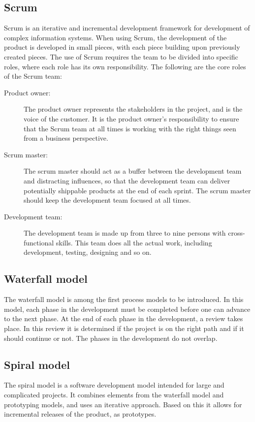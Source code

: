 \subsection{Scrum}
Scrum is an iterative and incremental development framework for development of complex information systems. When using Scrum, the development of the product is developed in small pieces, with each piece building upon previously created pieces. The use of Scrum requires the team to be divided into specific roles, where each role has its own responsibility. The following are the core roles of the Scrum team\cite{scrum}\cite{sommerville}:
\begin{description}
	\item[Product owner:]{The product owner represents the stakeholders in the project, and is the voice of the customer. It is the product owner's responsibility to ensure that the Scrum team at all times is working with the right things seen from a business perspective.}
	\item[Scrum master:]{The scrum master should act as a buffer between the development team and distracting influences, so that the development team can deliver potentially shippable products at the end of each sprint. The scrum master should keep the development team focused at all times.}
	\item[Development team:]{The development team is made up from three to nine persons with cross-functional skills. This team does all the actual work, including development, testing, designing and so on.}
\end{description}

\subsection{Waterfall model}
The waterfall model is among the first process models to be introduced. In this model, each phase in the development must be completed before one can advance to the next phase. At the end of each phase in the development, a review takes place. In this review it is determined if the project is on the right path and if it should continue or not. The phases in the development do not overlap. \cite{sommerville}

\subsection{Spiral model}
The spiral model is a software development model intended for large and complicated projects. It combines elements from the waterfall model and prototyping models, and uses an iterative approach. Based on this it allows for incremental releases of the product, as prototypes. \cite{sommerville}

